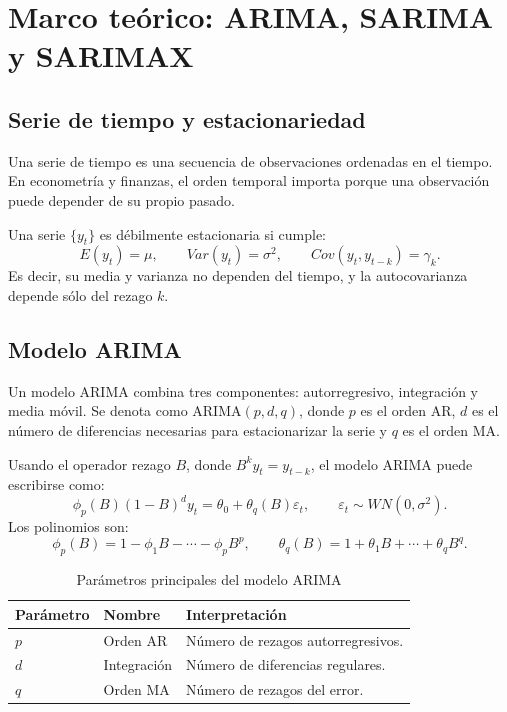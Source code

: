 \documentclass[11pt,letterpaper]{article}
\begin{document}
\section{Marco teórico: ARIMA, SARIMA y SARIMAX}

\subsection{Serie de tiempo y estacionariedad}

\begin{markdowncell}
Una serie de tiempo es una secuencia de observaciones ordenadas en el tiempo. En econometría y finanzas, el orden temporal importa porque una observación puede depender de su propio pasado.
\end{markdowncell}

\begin{latexcell}
Una serie \(\{y_t\}\) es débilmente estacionaria si cumple:
\[
E(y_t)=\mu, \qquad Var(y_t)=\sigma^2, \qquad Cov(y_t,y_{t-k})=\gamma_k.
\]
Es decir, su media y varianza no dependen del tiempo, y la autocovarianza depende sólo del rezago \(k\).
\end{latexcell}

\subsection{Modelo ARIMA}

\begin{markdowncell}
Un modelo ARIMA combina tres componentes: autorregresivo, integración y media móvil. Se denota como ARIMA\((p,d,q)\), donde \(p\) es el orden AR, \(d\) es el número de diferencias necesarias para estacionarizar la serie y \(q\) es el orden MA.
\end{markdowncell}

\begin{latexcell}
Usando el operador rezago \(B\), donde \(B^k y_t = y_{t-k}\), el modelo ARIMA puede escribirse como:
\[
\phi_p(B)(1-B)^d y_t = \theta_0 + \theta_q(B)\varepsilon_t,
\qquad \varepsilon_t \sim WN(0,\sigma^2).
\]
Los polinomios son:
\[
\phi_p(B)=1-\phi_1B-\cdots-\phi_pB^p,
\qquad
\theta_q(B)=1+\theta_1B+\cdots+\theta_qB^q.
\]
\end{latexcell}

\begin{table}[H]
\centering
\caption{Parámetros principales del modelo ARIMA}
\label{tab:arima}
\begin{tabular}{lll}
\toprule
\textbf{Parámetro} & \textbf{Nombre} & \textbf{Interpretación} \\
\midrule
\(p\) & Orden AR & Número de rezagos autorregresivos. \\
\(d\) & Integración & Número de diferencias regulares. \\
\(q\) & Orden MA & Número de rezagos del error. \\
\bottomrule
\end{tabular}
\end{table}
\end{document}
